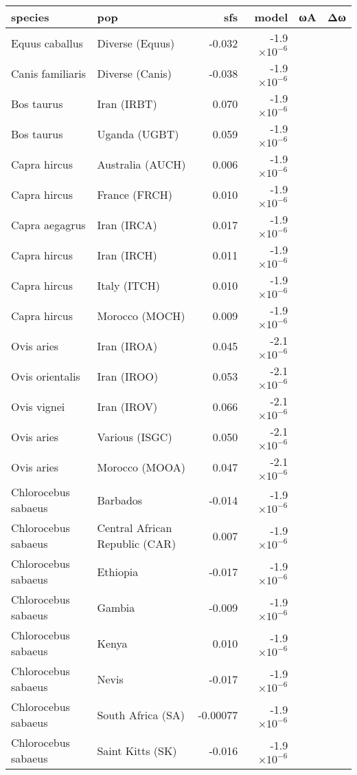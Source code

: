 \begin{tabular}{|l|l|r|r|r|r|}
    \toprule
    species & pop & sfs & model & ωA & Δω \\
    \midrule
    Equus caballus & Diverse (Equus) & -0.032 & -1.9$\times 10^{-6}$ \\
    Canis familiaris & Diverse (Canis) & -0.038 & -1.9$\times 10^{-6}$ \\
    Bos taurus & Iran (IRBT) & 0.070 & -1.9$\times 10^{-6}$ \\
    Bos taurus & Uganda (UGBT) & 0.059 & -1.9$\times 10^{-6}$ \\
    Capra hircus & Australia (AUCH) & 0.006 & -1.9$\times 10^{-6}$ \\
    Capra hircus & France (FRCH) & 0.010 & -1.9$\times 10^{-6}$ \\
    Capra aegagrus & Iran (IRCA) & 0.017 & -1.9$\times 10^{-6}$ \\
    Capra hircus & Iran (IRCH) & 0.011 & -1.9$\times 10^{-6}$ \\
    Capra hircus & Italy (ITCH) & 0.010 & -1.9$\times 10^{-6}$ \\
    Capra hircus & Morocco (MOCH) & 0.009 & -1.9$\times 10^{-6}$ \\
    Ovis aries & Iran (IROA) & 0.045 & -2.1$\times 10^{-6}$ \\
    Ovis orientalis & Iran (IROO) & 0.053 & -2.1$\times 10^{-6}$ \\
    Ovis vignei & Iran (IROV) & 0.066 & -2.1$\times 10^{-6}$ \\
    Ovis aries & Various (ISGC) & 0.050 & -2.1$\times 10^{-6}$ \\
    Ovis aries & Morocco (MOOA) & 0.047 & -2.1$\times 10^{-6}$ \\
    Chlorocebus sabaeus & Barbados & -0.014 & -1.9$\times 10^{-6}$ \\
    Chlorocebus sabaeus & Central African Republic (CAR) & 0.007 & -1.9$\times 10^{-6}$ \\
    Chlorocebus sabaeus & Ethiopia & -0.017 & -1.9$\times 10^{-6}$ \\
    Chlorocebus sabaeus & Gambia & -0.009 & -1.9$\times 10^{-6}$ \\
    Chlorocebus sabaeus & Kenya & 0.010 & -1.9$\times 10^{-6}$ \\
    Chlorocebus sabaeus & Nevis & -0.017 & -1.9$\times 10^{-6}$ \\
    Chlorocebus sabaeus & South Africa (SA) & -0.00077 & -1.9$\times 10^{-6}$ \\
    Chlorocebus sabaeus & Saint Kitts (SK) & -0.016 & -1.9$\times 10^{-6}$ \\

\end{tabular}
